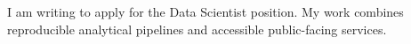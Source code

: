 \documentclass{careerdossier-letter}
\begin{document}
\MakeCDossierLetterhead

I am writing to apply for the Data Scientist position. My work combines
reproducible analytical pipelines and accessible public-facing services.

\MakeCDossierClosing
\end{document}
